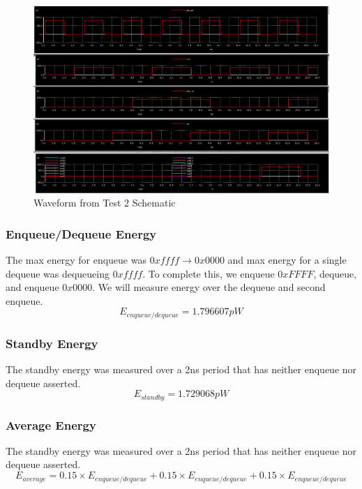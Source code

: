 \documentclass[a4paper]{article}
\begin{document}
\begin{figure}[H]
	\centering
	\includegraphics[scale=0.25]{topLevelTestEnergyWaveform}
	\caption{Waveform from Test 2 Schematic}
	\label{fig:topLevelTestEnergyWaveform}
\end{figure}

\subsubsection{Enqueue/Dequeue Energy}
The max energy for enqueue was $0xffff \rightarrow 0x0000$ and max energy for a single dequeue was dequeueing $0xffff$. To complete this, we enqueue $0xFFFF$, dequeue, and enqueue $0x0000$. We will measure energy over the dequeue and second enqueue.
$$E_{enqueue/dequeue} = 1.796607pW$$

\subsubsection{Standby Energy}
The standby energy was measured over a 2ns period that has neither enqueue nor dequeue asserted.
$$E_{standby} = 1.729068pW$$

\subsubsection{Average Energy}
The standby energy was measured over a 2ns period that has neither enqueue nor dequeue asserted.
$$E_{average} = 0.15 \times E_{enqueue/dequeue} + 0.15 \times E_{enqueue/dequeue} + 0.15 \times E_{enqueue/dequeue}$$

\end{document}
